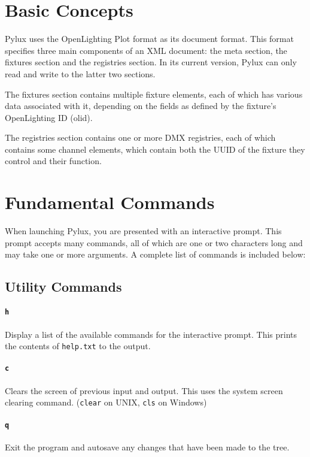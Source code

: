 \documentclass[a4paper]{article}
\begin{document}
\section{Basic Concepts}
Pylux uses the OpenLighting Plot format as its document format. This format 
specifies three main components of an XML document: the meta section, the 
fixtures section and the registries section. In its current version, Pylux 
can only read and write to the latter two sections.

The fixtures section contains multiple fixture elements, each of which has 
various data associated with it, depending on the fields as defined by the 
fixture's OpenLighting ID (olid).

The registries section contains one or more DMX registries, each of which 
contains some channel elements, which contain both the UUID of the fixture 
they control and their function.

\section{Fundamental Commands}
When launching Pylux, you are presented with an interactive prompt. This 
prompt accepts many commands, all of which are one or two characters long and 
may take one or more arguments. A complete list of commands is included below: 

\subsection{Utility Commands}

\paragraph{\texttt{h}}
Display a list of the available commands for the interactive prompt. This 
prints the contents of \texttt{help.txt}  to the output.

\paragraph{\texttt{c}}
Clears the screen of previous input and output. This uses the system screen 
clearing command. (\texttt{clear} on UNIX, \texttt{cls} on Windows)

\paragraph{\texttt{q}}
Exit the program and autosave any changes that have been made to the tree.
\end{document}
